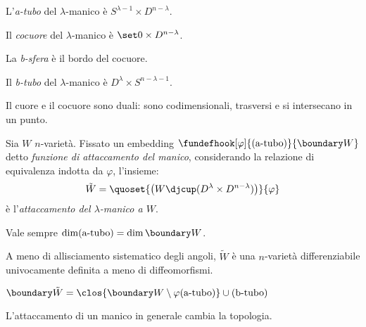 \begin{defn}[A-tubo]
	L'\emph{a-tubo} del $\lambda$-manico è $S^{\lambda-1}\times D^{n-\lambda}$.
\end{defn}

\begin{defn}[Cocuore]
	Il \emph{cocuore} del $\lambda$-manico è $\set0\times D^{n-\lambda}$.
\end{defn}

\begin{defn}[B-sfera]
	La \emph{b-sfera} è il bordo del cocuore.
\end{defn}

\begin{defn}[B-tubo]
	Il \emph{b-tubo} del $\lambda$-manico è $D^\lambda\times S^{n-\lambda-1}$.
\end{defn}

\begin{oss}
	Il cuore e il cocuore sono duali: sono codimensionali, trasversi e si intersecano in un punto.
\end{oss}

\begin{defn}[Attaccamento]
	Sia $W$ $n$-varietà.
	Fissato un embedding $\fundefhook[\varphi]{(\text{a-tubo})}{\boundary W}$ detto \emph{funzione di attaccamento del manico}, considerando la relazione di equivalenza indotta da $\varphi$, l'insieme:
	\[\tilde W=\quoset{\big(W\djcup(D^\lambda\times D^{n-\lambda})\big)}{\varphi}\]
	è l'\emph{attaccamento del $\lambda$-manico a $W$}.
\end{defn}

\begin{oss}
	Vale sempre $\dim(\text{a-tubo})=\dim\boundary W$.
\end{oss}

\begin{teo}
	A meno di allisciamento sistematico degli angoli, $\tilde W$ è una $n$-varietà differenziabile univocamente definita a meno di diffeomorfismi.
\end{teo}

\begin{oss}
	$\boundary \tilde W=\clos{\boundary W\setminus\varphi(\text{a-tubo})}\cup(\text{b-tubo})$
\end{oss}

\begin{oss}
	L'attaccamento di un manico in generale cambia la topologia.
\end{oss}

